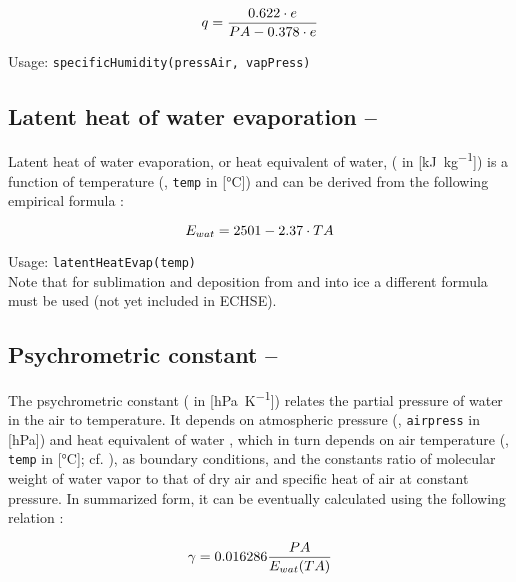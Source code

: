 \begin{equation} \label{eqn:meteo:spechum}
q{} = \frac{0.622 \cdot e{}}{PA{} - 0.378 \cdot e{}}
\end{equation}

\noindent
Usage:
\verb!specificHumidity(pressAir, vapPress)!\\


\subsection{Latent heat of water evaporation -- \evapHeatWater} \label{sec:meteo:evapheat}
Latent heat of water evaporation, or heat equivalent of water, (\evapHeatWater{} in [\si{\kilo\joule\per\kilo\gram}]) is a function of temperature (\airtemp{}, \verb!temp! in [\si{\degreeCelsius}]) and can be derived from the following empirical formula \citep{Dyck1995}:

\begin{equation} \label{eqn:meteo:evapheat}
E_{wat}{} = 2501 - 2.37 \cdot TA{}
\end{equation}

\noindent
Usage:
\verb!latentHeatEvap(temp)!\\

Note that for sublimation and deposition from and into ice a different formula must be used (not yet included in ECHSE).


\subsection{Psychrometric constant -- \psychroConst} \label{sec:meteo:psychro}
The psychrometric constant (\psychroConst{} in [\si{\hecto\pascal\per\kelvin}]) relates the partial pressure of water in the air to temperature. It depends on atmospheric pressure (\airPressure{}, \verb!airpress! in [\si{\hecto\pascal}]) and heat equivalent of water \evapHeatWater{}, which in turn depends on air temperature (\airtemp{}, \verb!temp! in [\si{\degreeCelsius}]; cf. ), as boundary conditions, and the constants ratio of molecular weight of water vapor to that of dry air and specific heat of air at constant pressure. In summarized form, it can be eventually calculated using the following relation \citep{Dyck1995}:

\begin{equation} \label{eqn:meteo:psychro}
\gamma{} = 0.016286 \frac{PA{}}{E_{wat}{(TA{})}}
\end{equation}

